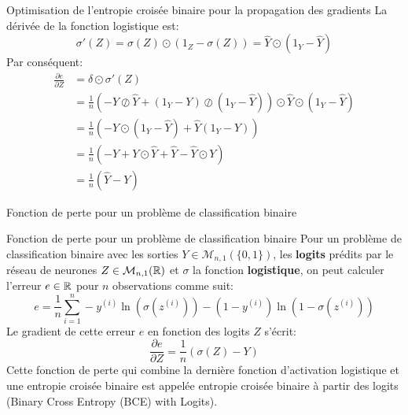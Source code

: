 \begin{frame}{Optimisation de l'entropie croisée binaire pour la propagation des gradients}
	La dérivée de la fonction logistique est:
	\begin{equation*}
		\sigma'(Z) = \sigma(Z) \odot \left(1_Z - \sigma(Z)\right) = \hat{Y} \odot (1_Y - \hat{Y})
	\end{equation*}
	\pause
	Par conséquent:
	\begin{equation*}
		\begin{aligned}
			\frac{\partial{e}}{\partial{Z}} 
			&= \delta \odot \sigma'(Z) \\
			&= \frac{1}{n} \left( - Y \oslash \hat{Y} + \left(1_Y - Y\right) \oslash \left(1_Y - \hat{Y}\right)\right) \odot \hat{Y} \odot (1_Y - \hat{Y}) \\
			&= \frac{1}{n} \left( - Y \odot (1_Y - \hat{Y}) + \hat{Y} \left(1_Y - Y\right)\right) \\
			&= \frac{1}{n} \left( - Y + Y \odot \hat{Y} + \hat{Y} - \hat{Y} \odot Y \right) \\
			&= \frac{1}{n} \left( \hat{Y} -Y \right)
		\end{aligned}
	\end{equation*}
\end{frame}

\begin{frame}{Fonction de perte pour un problème de classification binaire}
	\begin{block}{Fonction de perte pour un problème de classification binaire}
		Pour un problème de classification binaire avec les sorties $Y \in \mathcal{M}_{n,1}(\{0, 1\})$, les \textbf{logits} prédits par le réseau de neurones $Z \in \mathcal{M}_{n,1}(\mathbb{R})$ et $\sigma$ la fonction \textbf{logistique}, on peut calculer l'erreur $e \in \mathbb{R}$ pour $n$ observations comme suit:
		\begin{equation*}
			e = \frac{1}{n} \sum_{i=1}^n - y^{(i)} \ln{\left(\sigma\left(z^{(i)}\right)\right)} - \left(1 - y^{(i)}\right) \ln{\left(1 - \sigma\left(z^{(i)}\right)\right)}
		\end{equation*}
		Le gradient de cette erreur $e$ en fonction des logits $Z$ s'écrit:
		\begin{equation*}
			\frac{\partial{e}}{\partial{Z}} = \frac{1}{n} \left(\sigma\left(Z\right) - Y\right)
		\end{equation*}
		Cette fonction de perte qui combine la dernière fonction d'activation logistique et une entropie croisée binaire est appelée entropie croisée binaire à partir des logits (Binary Cross Entropy (BCE) with Logits).
	\end{block}
\end{frame}

